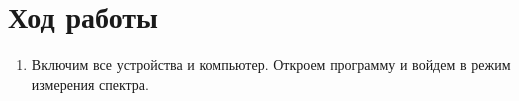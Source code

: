 \documentclass[a4paper, 12pt]{article}%
\begin{document}
\section{Ход работы}

\begin{enumerate}
\item Включим все устройства и компьютер. Откроем программу и войдем в режим измерения спектра.

	\begin{figure}[h!]
\end{figure}
\end{enumerate}
\end{document}
